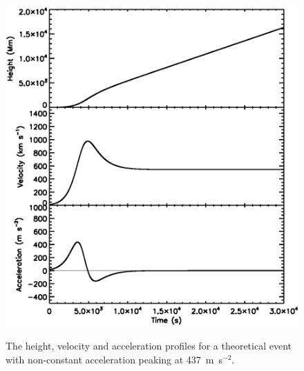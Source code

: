 \documentclass[structabstract]{aa}
\begin{document}
\begin{figure}[!t]
\centering
{\includegraphics[scale=0.55, trim=0 50 0 40, clip=true]{images/fig_peaked_accel_kins.eps}}
\caption{The height, velocity and acceleration profiles for a theoretical event with non-constant acceleration peaking at 437~m~s$^{-2}$.}
\label{fig_peaked_accel_kins}
\end{figure}
\end{document}
